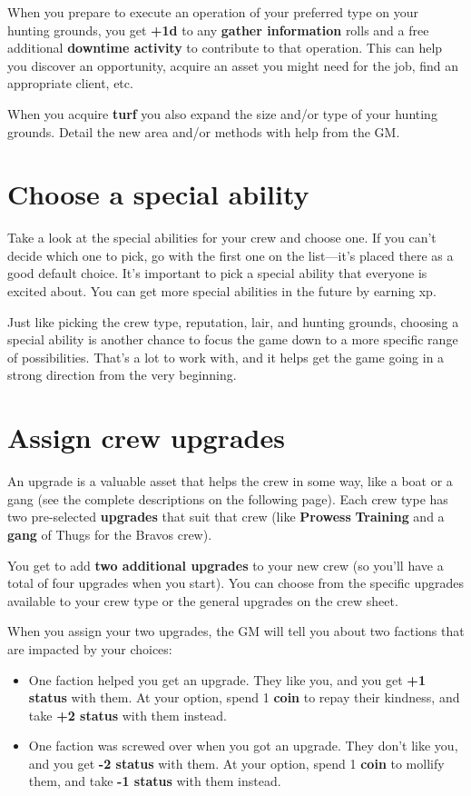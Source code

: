 \documentclass[11pt,fleqn,a5paper]{book}
\newcommand{\gameterm}[1]{\textbf{#1}}
\begin{document}
When you prepare to execute an operation of your preferred type on your hunting grounds, you  get \textbf{+1d} to any \textbf{gather information} rolls and a free additional \textbf{downtime activity} to contribute to that operation. This can help you discover an opportunity, acquire an asset you might need for the job, find an appropriate client, etc.

When you acquire \textbf{turf} you also expand the size and/or type of your hunting grounds. Detail the new area and/or methods with help from the GM.

\section{Choose a special ability}

Take a look at the special abilities for your crew and choose one. If you can’t decide which one to pick, go with the first one on the list---it’s placed there as a good default choice. It’s important to pick a special ability that everyone is excited about. You can get more special abilities in the future by earning xp.

Just like picking the crew type, reputation, lair, and hunting grounds, choosing a special ability is another chance to focus the game down to a more specific range of possibilities. That’s a lot to work with, and it helps get the game going in a strong direction from the very beginning.

\section{Assign crew upgrades}

An upgrade is a valuable asset that helps the crew in some way, like a boat or a gang (see the complete descriptions on the following page). Each crew type has two pre-selected \textbf{upgrades} that suit that crew (like \textbf{Prowess} \textbf{Training} and a\textbf{ gang} of Thugs for the Bravos crew).

You get to add \textbf{two additional upgrades} to your new crew (so you’ll have a total of four upgrades when you start). You can choose from the specific upgrades available to your crew type or the general upgrades on the crew sheet.

When you assign your two upgrades, the GM will tell you about two factions that are impacted by your choices:

\begin{itemize}
	\item One faction helped you get an upgrade. They like you, and you get \textbf{+1 status} with them. At your option, spend 1 \gameterm{coin } to repay their kindness, and take \textbf{+2 status} with them instead.
	\item One faction was screwed over when you got an upgrade. They don’t like you, and you get \textbf{-2 status} with them. At your option, spend 1 \gameterm{coin } to mollify them, and take \textbf{-1 status} with them instead.
\end{itemize}
\end{document}
